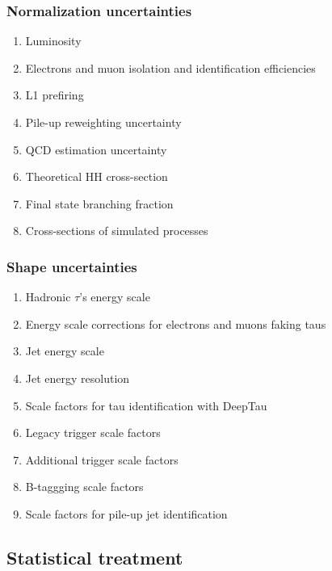 \documentclass[11pt]{article}
\begin{document}
\subsubsection{Normalization uncertainties}
\label{sec:orga230e9f}
\begin{enumerate}
\item Luminosity
\label{sec:orgc2d8af9}
\item Electrons and muon isolation and identification efficiencies
\label{sec:org3d965f2}
\item L1 prefiring
\label{sec:org71dac48}
\item Pile-up reweighting uncertainty
\label{sec:orge7cc9a0}
\item QCD estimation uncertainty
\label{sec:org714efb8}
\item Theoretical HH cross-section
\label{sec:orgd620ed1}
\item Final state branching fraction
\label{sec:orged50a74}
\item Cross-sections of simulated processes
\label{sec:org1f5f331}
\end{enumerate}
\subsubsection{Shape uncertainties}
\label{sec:orga62c370}
\begin{enumerate}
\item Hadronic \(\tau\)'s energy scale
\label{sec:org76b5149}
\item Energy scale corrections for electrons and muons faking taus
\label{sec:org85ab32c}
\item Jet energy scale
\label{sec:org2181667}
\item Jet energy resolution
\label{sec:orga6e0585}
\item Scale factors for tau identification with DeepTau
\label{sec:org3fd00fe}
\item Legacy trigger scale factors
\label{sec:org498b2b8}
\item Additional trigger scale factors
\label{sec:orge406d32}
\item B-taggging scale factors
\label{sec:org838594b}
\item Scale factors for pile-up jet identification
\label{sec:orgd18b712}
\end{enumerate}
\subsection{Statistical treatment}
\label{sec:org1735411}
\end{document}
